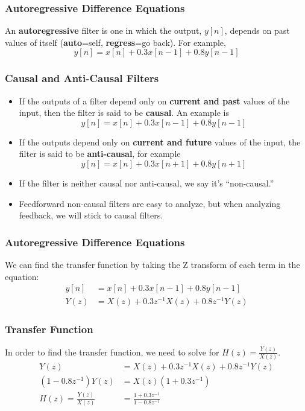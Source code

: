 \documentclass{beamer}
\begin{document}
\begin{frame}
  \frametitle{Autoregressive Difference Equations}

  An {\bf autoregressive} filter is one in which the output, $y[n]$,
  depends on past values of itself ({\bf auto}=self, {\bf
    regress}=go back).  For example,
  \[
  y[n] = x[n] + 0.3x[n-1] + 0.8 y[n-1]
  \]
  
\end{frame}

\begin{frame}
  \frametitle{Causal and Anti-Causal Filters}

  \begin{itemize}
  \item If the outputs of a filter depend only on {\bf current and
    past} values of the input, then the filter is said to be {\bf
    causal}.  An example is
    \[
    y[n] = x[n] + 0.3x[n-1] + 0.8 y[n-1]
    \]
  \item If the outputs depend only on {\bf current and future} values
    of the input, the filter is said to be {\bf anti-causal}, for example
    \[
    y[n]=x[n]+0.3x[n+1]+0.8y[n+1]
    \]
  \item If the filter is neither causal nor anti-causal, we say it's
    ``non-causal.''
  \item Feedforward non-causal filters are easy to analyze, but when
    analyzing feedback, we will stick to causal filters.
  \end{itemize}
  
\end{frame}

\begin{frame}
  \frametitle{Autoregressive Difference Equations}

  We can find the transfer function by taking the Z transform of each term
  in the equation:
  \begin{align*}
    y[n] &= x[n] + 0.3 x[n-1] +  0.8 y[n-1]\\
    Y(z) &= X(z) + 0.3z^{-1}X(z) + 0.8  z^{-1}Y(z)
  \end{align*}
  
\end{frame}

\begin{frame}
  \frametitle{Transfer Function}

  In order to find the transfer function, we need to solve for
  $H(z)=\frac{Y(z)}{X(z)}$.
  \begin{align*}
    Y(z) &= X(z) + 0.3z^{-1}X(z) + 0.8 z^{-1}Y(z)\\
    \left(1-0.8z^{-1}\right)Y(z) &= X(z)(1+0.3z^{-1})\\
    H(z) =\frac{Y(z)}{X(z)} &= \frac{1+0.3z^{-1}}{1-0.8 z^{-1}}
  \end{align*}
\end{frame}
\end{document}
